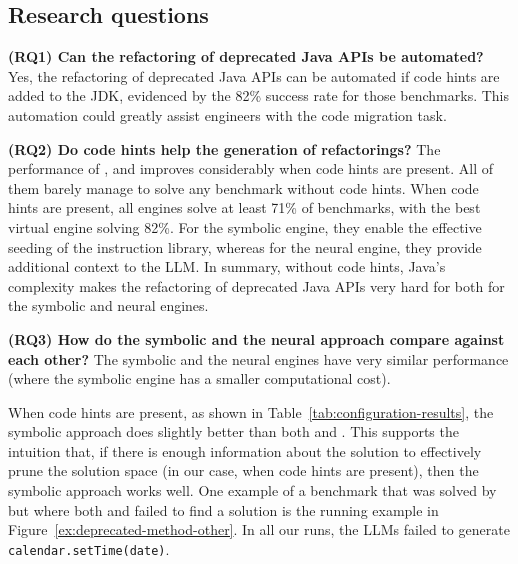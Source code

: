 \documentclass[sigconf]{acmart}
\begin{document}
\subsection{Research questions}

{\bf (RQ1) Can the refactoring of deprecated Java APIs be automated?}
%
Yes, the refactoring of deprecated Java APIs can be automated if code hints are added to the JDK,
evidenced by the 82\% success rate for those benchmarks.
This automation could greatly assist engineers with the code migration task.

\noindent
{\bf (RQ2) Do code hints help the generation of refactorings?}
%
The performance of \tool, \llma and \llmb improves considerably when code
hints are present.  All of them barely manage to solve any benchmark without
code hints.  When code hints are present, all engines solve at least 71\% of
benchmarks, with the best virtual engine solving 82\%.  For the symbolic
engine, they enable the effective seeding of the instruction library,
whereas for the neural engine, they provide additional context to the LLM.
In summary, without code hints, Java's complexity makes the refactoring
of deprecated Java APIs very hard for both for the
symbolic and neural engines.

\noindent
{\bf (RQ3) How do the symbolic and the neural approach compare against each other?}
%
The symbolic and the neural engines have very similar performance (where the symbolic engine has a smaller computational cost).



When code hints are present, as shown in
Table~\ref{tab:configuration-results}, the symbolic approach does slightly
better than both \llma and \llmb.  This supports the intuition that, if
there is enough information about the solution to effectively prune the
solution space (in our case, when code hints are present),
%
then the symbolic approach works well. %
%
One example of a benchmark that was solved by \tool but where both \llma and
\llmb failed to find a solution is the running example in
Figure~\ref{ex:deprecated-method-other}.  In all our runs, the LLMs failed
to generate \lstinline[breaklines=true]{calendar.setTime(date)}.
\end{document}
